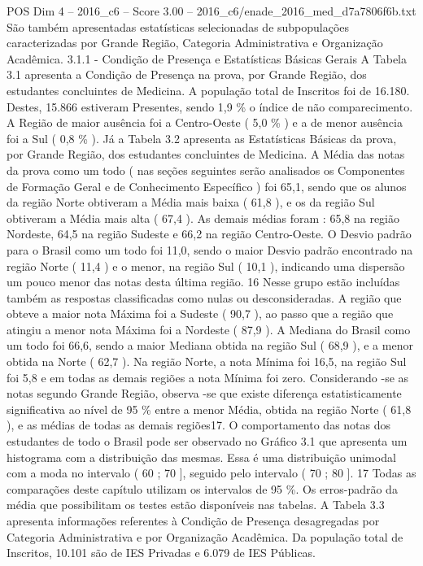 \begin{textsample}{POS Dim 4 – 2016\_c6 – Score 3.00 – 2016\_c6/enade\_2016\_med\_d7a7806f6b.txt}
São também apresentadas estatísticas selecionadas de subpopulações caracterizadas por Grande Região, Categoria Administrativa e Organização Acadêmica. 3.1.1 - Condição de Presença e Estatísticas Básicas Gerais A Tabela 3.1 apresenta a Condição de Presença na prova, por Grande Região, dos estudantes concluintes de Medicina.
A população total de Inscritos foi de 16.180.
Destes, 15.866 estiveram Presentes, sendo 1,9 \% o índice de não comparecimento.
A Região de maior ausência foi a Centro-Oeste ( 5,0 \% ) e a de menor ausência foi a Sul ( 0,8 \% ).
Já a Tabela 3.2 apresenta as Estatísticas Básicas da prova, por Grande Região, dos estudantes concluintes de Medicina.
A Média das notas da prova como um todo ( nas seções seguintes serão analisados os Componentes de Formação Geral e de Conhecimento Específico ) foi 65,1, sendo que os alunos da região Norte obtiveram a Média mais baixa ( 61,8 ), e os da região Sul obtiveram a Média mais alta ( 67,4 ).
As demais médias foram : 65,8 na região Nordeste, 64,5 na região Sudeste e 66,2 na região Centro-Oeste.
O Desvio padrão para o Brasil como um todo foi 11,0, sendo o maior Desvio padrão encontrado na região Norte ( 11,4 ) e o menor, na região Sul ( 10,1 ), indicando uma dispersão um pouco menor das notas desta última região. 16 Nesse grupo estão incluídas também as respostas classificadas como nulas ou desconsideradas.
A região que obteve a maior nota Máxima foi a Sudeste ( 90,7 ), ao passo que a região que atingiu a menor nota Máxima foi a Nordeste ( 87,9 ).
A Mediana do Brasil como um todo foi 66,6, sendo a maior Mediana obtida na região Sul ( 68,9 ), e a menor obtida na Norte ( 62,7 ).
Na região Norte, a nota Mínima foi 16,5, na região Sul foi 5,8 e em todas as demais regiões a nota Mínima foi zero.
Considerando -se as notas segundo Grande Região, observa -se que existe diferença estatisticamente significativa ao nível de 95 \% entre a menor Média, obtida na região Norte ( 61,8 ), e as médias de todas as demais regiões17.
O comportamento das notas dos estudantes de todo o Brasil pode ser observado no Gráfico 3.1 que apresenta um histograma com a distribuição das mesmas.
Essa é uma distribuição unimodal com a moda no intervalo ( 60 ; 70 ], seguido pelo intervalo ( 70 ; 80 ]. 17 Todas as comparações deste capítulo utilizam os intervalos de 95 \%.
Os erros-padrão da média que possibilitam os testes estão disponíveis nas tabelas.
A Tabela 3.3 apresenta informações referentes à Condição de Presença desagregadas por Categoria Administrativa e por Organização Acadêmica.
Da população total de Inscritos, 10.101 são de IES Privadas e 6.079 de IES Públicas.

\end{textsample}

